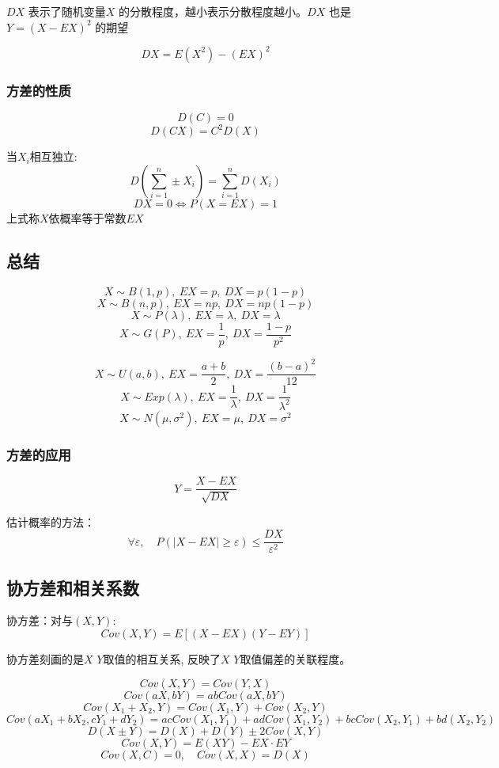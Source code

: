\documentclass[10pt, a4paper]{article}
\begin{document}
    $DX$ 表示了随机变量$X$ 的分散程度，越小表示分散程度越小。$DX$ 也是 $Y = (X - EX)^2$ 的期望

    $$DX = E(X^2) - (EX)^2$$

    \subsubsection{方差的性质}   
    $$D(C) = 0$$
    $$D(CX) = C^2D(X)$$

    当$X_i$相互独立:
    $$D(\sum_{i = 1}^n \pm X_i) = \sum_{i = 1}^nD(X_i)$$
    $$DX = 0 \Leftrightarrow P(X = EX) = 1$$
    上式称$X$依概率等于常数$EX$

    \subsection{总结}
    $$X \sim B(1, p),\ EX = p,\ DX = p(1 - p)$$
    $$X \sim B(n, p),\ EX = np,\ DX = np(1 - p)$$
    $$X \sim P(\lambda),\ EX = \lambda,\ DX = \lambda$$
    $$X \sim G(P),\ EX = \frac{1}{p},\ DX = \frac{1 - p}{p^2}$$
    
    $$X \sim U(a, b),\ EX = \frac{a + b}{2},\ DX = \frac{(b - a)^2}{12}$$
    $$X \sim Exp(\lambda),\ EX = \frac{1}{\lambda},\ DX = \frac{1}{\lambda^2}$$
    $$X \sim N(\mu, \sigma^2),\ EX = \mu,\ DX = \sigma^2$$

    \subsubsection{方差的应用}
    $$Y = \frac{X - EX}{\sqrt{DX}}$$
    
    估计概率的方法： 
    $$\forall \varepsilon,\quad P(|X - EX| \geqslant \varepsilon) \leqslant \frac{DX}{\varepsilon^2}$$

    \subsection{协方差和相关系数}
        协方差：对与$(X, Y)$:
        $$Cov(X, Y) = E[(X - EX)(Y - EY)]$$

        协方差刻画的是$X$ $Y$取值的相互关系, 反映了$X$ $Y$取值偏差的关联程度。

        $$Cov(X, Y) = Cov(Y, X)$$
        $$Cov(aX, bY) = abCov(aX, bY)$$
        $$Cov(X_1 + X_2, Y) = Cov(X_1, Y) + Cov(X_2, Y)$$
        $$Cov(aX_1 + bX_2, cY_1 + dY_2) = acCov(X_1, Y_1) + adCov(X_1, Y_2) + bcCov(X_2, Y_1) + bd(X_2, Y_2)$$
        $$D(X \pm Y) = D(X) + D(Y) \pm 2Cov(X, Y)$$
        $$Cov(X, Y) = E(XY) - EX\cdot EY$$
        $$Cov(X, C) = 0, \quad Cov(X, X) = D(X)$$
    
\end{document}
